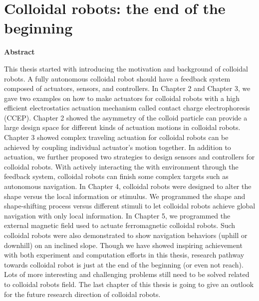 \chapter{Colloidal robots: the end of the beginning }
\begin{center}
\textbf{Abstract}
\end{center}
This thesis started with introducing the motivation and background of colloidal robots. A fully autonomous colloidal robot should have a feedback system composed of actuators, sensors, and controllers.  In Chapter 2 and Chapter 3, we gave two examples on how to make actuators for colloidal robots with a high efficient electrostatics actuation mechanism called contact charge electrophoresis (CCEP). Chapter 2 showed the asymmetry of the colloid particle can provide a large design space for different kinds of actuation motions in colloidal robots.  Chapter 3 showed complex traveling actuation for colloidal robots can be achieved by coupling individual actuator's motion together.  In addition to actuation, we further proposed two strategies to design sensors and controllers for colloidal robots. With actively interacting the with environment through the feedback system, colloidal robots can finish some complex targets such as autonomous navigation. In Chapter 4, colloidal robots were designed to alter the shape versus the local information or stimulus. We programmed the shape and shape-shifting process versus different stimuli to let colloidal robots achieve global navigation with only local information. In Chapter 5, we programmed the external magnetic field used to actuate ferromagnetic colloidal robots. Such colloidal robots were also demonstrated to show navigation behaviors  (uphill or downhill) on an inclined slope. Though we have showed inspiring achievement with both experiment and computation efforts in this thesis, research pathway towards colloidal robot is just at the end of the beginning (or even not reach). Lots of more interesting and challenging problems still need to be solved related to colloidal robots field. The last chapter of this thesis is going to give an outlook for the future research direction of colloidal robots.
